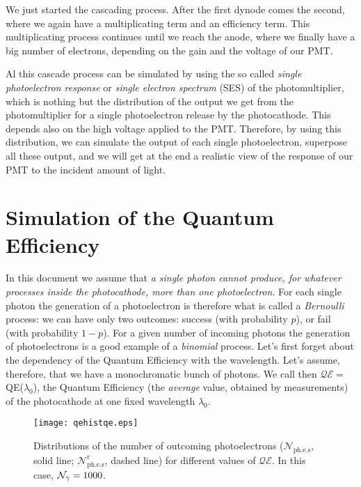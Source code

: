 \documentclass{article}
\def\QE{\ensuremath{\mathcal{QE}}\xspace}
\def\Nphot{\ensuremath{%
  \mathcal{N}_{\gamma}}\xspace}
\def\Ntrial{\ensuremath{%
  \mathcal{N}_{\mathrm{ph.e.s}}}\xspace}
\def\Nrand{\ensuremath{%
  \mathcal{N}^{\mathrm{r}}_{\mathrm{ph.e.s}}}\xspace}
\begin{document}
We just started the cascading process. After the first dynode comes
the second, where we again have a multiplicating term and an
efficiency term. This multiplicating process continues until we reach
the anode, where we finally have a big number of electrons, depending
on the gain and the voltage of our PMT.

Al this cascade process can be simulated by using the so called
\emph{single photoelectron response} or \emph{single electron
spectrum} (SES) of the photomultiplier, which is nothing but the
distribution of the output we get from the photomultiplier for a
single photoelectron release by the photocathode. This depends also on
the high voltage applied to the PMT. Therefore, by using this
distribution, we can simulate the output of each single photoelectron,
superpose all these output, and we will get at the end a realistic
view of the response of our PMT to the incident amount of light.


\section{Simulation of the Quantum Efficiency}

In this document we assume that \emph{a single photon cannot produce,
for whatever processes inside the photocathode, more than one
photoelectron}. For each single photon the generation of a
photoelectron is therefore what is called a \emph{Bernoulli} process:
we can have only two outcomes: success (with probability $p$), or fail
(with probability $1-p$). For a given number of incoming photons the
generation of photoelectrons is a good example of a \emph{binomial}
process. Let's first forget about the dependency of the Quantum
Efficiency with the wavelength. Let's assume, therefore, that we have
a monochromatic bunch of photons. We call then $\QE=$QE($\lambda_0$),
the Quantum Efficiency (the \emph{average} value, obtained by
measurements) of the photocathode at one fixed wavelength $\lambda_0$.

\begin{figure*}[tb]
  \begin{center}
    \texttt{[image: qehistqe.eps]}
    \caption{Distributions of the number of outcoming photoelectrons 
      (\Ntrial, solid line; \Nrand, dashed line) for different values of
      \QE. In this case, $\Nphot=1000$.}
    \label{fig:distrib1}
  \end{center}
\end{figure*}
\end{document}
